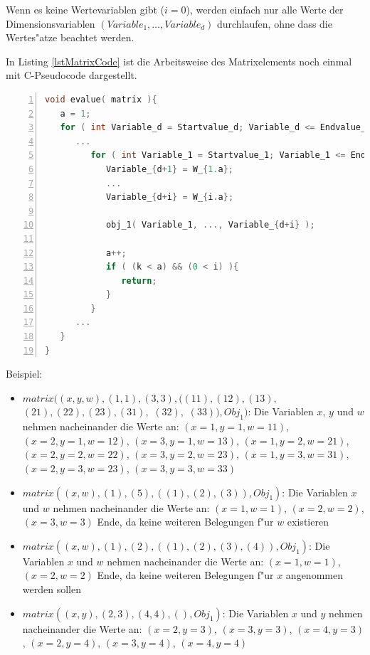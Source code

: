 Wenn es keine Wertevariablen gibt ($i=0$), werden einfach nur alle Werte der Dimensionsvariablen $(Variable_1, \ldots, Variable_d)$ durchlaufen, ohne dass die Wertes"atze beachtet werden.

In Listing \ref{lstMatrixCode} ist die Arbeitsweise des Matrixelements noch einmal mit C-Pseudo\-code dargestellt.

\begin{lstlisting}[language=C, numbers=left, frame=single, caption={Pseudoalgorithmus des Matrixelements}, label={lstMatrixCode}, breaklines, basicstyle=\footnotesize\ttfamily, numberstyle=\tiny]
void evalue( matrix ){
   a = 1;
   for ( int Variable_d = Startvalue_d; Variable_d <= Endvalue_d; Variable_d += 1 ){
      ...
         for ( int Variable_1 = Startvalue_1; Variable_1 <= Endvalue_1; Variable_1 += 1 ){
            Variable_{d+1} = W_{1.a};
            ...
            Variable_{d+i} = W_{i.a};
   
            obj_1( Variable_1, ..., Variable_{d+i} );
   
            a++;
            if ( (k < a) && (0 < i) ){
               return;
            }
         }
      ...
   }
}
\end{lstlisting}


\bigskip\noindent
Beispiel:
\begin{itemize}
 \item $matrix( (x, y, w), (1, 1), ( 3, 3), ( (11), (12), (13),$ $ (21), (22), (23), (31),$ $(32),$ $(33) ), Obj_1)$: Die Variablen $x$, $y$ und $w$ nehmen nacheinander die Werte an: $( x=1, y=1, w=11)$, $( x=2, y=1, w=12)$, $( x=3, y=1, w=13)$, $( x=1, y=2, w=21)$, $( x=2, y=2, w=22)$, $( x=3, y=2, w=23)$, $( x=1, y=3, w=31)$, $( x=2, y=3, w=23)$, $( x=3, y=3, w=33)$
 \item $matrix( (x, w), (1), (5), ( (1), (2), (3) ), Obj_1)$: Die Variablen $x$ und $w$ nehmen nacheinander die Werte an: $( x=1, w=1)$, $( x=2, w=2)$, $( x=3, w=3)$ Ende, da keine weiteren Belegungen f"ur $w$ existieren
 \item $matrix( (x, w), (1), (2), ( (1), (2), (3), (4) ), Obj_1)$: Die Variablen $x$ und $w$ nehmen nacheinander die Werte an: $( x=1, w=1)$, $( x=2, w=2)$ Ende, da keine weiteren Belegungen f"ur $x$ angenommen werden sollen
 \item $matrix( (x, y), (2, 3), (4, 4), ( ), Obj_1)$: Die Variablen $x$ und $y$ nehmen nacheinander die Werte an: $( x=2, y=3)$, $( x=3, y=3)$, $( x=4, y=3)$, $( x=2, y=4)$, $( x=3, y=4)$, $( x=4, y=4)$
\end{itemize}

